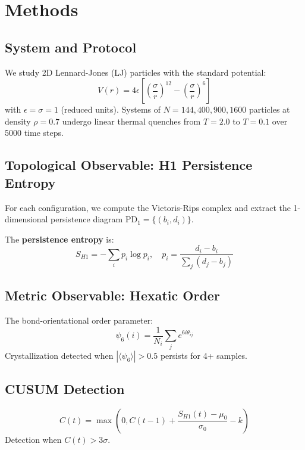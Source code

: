\documentclass[aps,pre,twocolumn,superscriptaddress]{revtex4-2}
\begin{document}
\section{Methods}

\subsection{System and Protocol}

We study 2D Lennard-Jones (LJ) particles with the standard potential:
\begin{equation}
V(r) = 4\epsilon\left[\left(\frac{\sigma}{r}\right)^{12} - \left(\frac{\sigma}{r}\right)^{6}\right]
\end{equation}
with $\epsilon = \sigma = 1$ (reduced units). Systems of $N = 144, 400, 900, 1600$ particles at density $\rho = 0.7$ undergo linear thermal quenches from $T = 2.0$ to $T = 0.1$ over 5000 time steps.

\subsection{Topological Observable: H1 Persistence Entropy}

For each configuration, we compute the Vietoris-Rips complex and extract the 1-dimensional persistence diagram $\text{PD}_1 = \{(b_i, d_i)\}$.

The \textbf{persistence entropy} is:
\begin{equation}
S_{H1} = -\sum_i p_i \log p_i, \quad p_i = \frac{d_i - b_i}{\sum_j (d_j - b_j)}
\end{equation}

\subsection{Metric Observable: Hexatic Order}

The bond-orientational order parameter:
\begin{equation}
\psi_6(i) = \frac{1}{N_i}\sum_{j} e^{6i\theta_{ij}}
\end{equation}
Crystallization detected when $|\langle\psi_6\rangle| > 0.5$ persists for 4+ samples.

\subsection{CUSUM Detection}

\begin{equation}
C(t) = \max\left(0, C(t-1) + \frac{S_{H1}(t) - \mu_0}{\sigma_0} - k\right)
\end{equation}
Detection when $C(t) > 3\sigma$.
\end{document}

